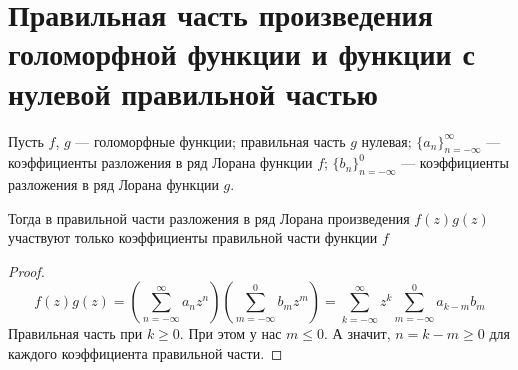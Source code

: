 \section{Правильная часть произведения голоморфной функции и функции с нулевой правильной частью}
\begin{Th*}
Пусть $f$, $g$ --- голоморфные функции; правильная часть $g$ нулевая; 
$\{a_n\}_{n=-\infty}^\infty$ --- коэффициенты разложения в ряд Лорана функции $f$;
$\{b_n\}_{n=-\infty}^{0}$ --- коэффициенты разложения в ряд Лорана функции $g$.

Тогда в правильной части разложения в ряд Лорана произведения $f(z)g(z)$ участвуют только коэффициенты правильной части функции $f$
\end{Th*}
\begin{proof}
\[
    f(z)g(z) =
%
    \left(\sum_{n=-\infty}^{\infty} a_n z^n\right)
    \left(\sum_{m=-\infty}^{0} b_m z^m\right) =
%
    \sum_{k=-\infty}^{\infty} z^k \sum_{m=-\infty}^{0} a_{k-m} b_m
\]
Правильная часть при $k \ge 0$. При этом у нас $m \le 0$. А значит, $n = k-m \ge 0$ для каждого коэффициента правильной части.
\end{proof}
